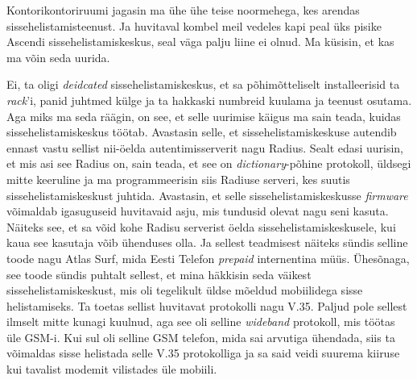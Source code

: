 Kontorikontoriruumi jagasin ma ühe ühe teise noormehega, kes arendas sissehelistamisteenust. Ja  huvitaval kombel meil vedeles kapi peal üks pisike Ascendi sissehelistamiskeskus, seal väga palju liine ei olnud. Ma küsisin, et kas ma võin seda uurida.


Ei, ta oligi \emph{deidcated} sissehelistamiskeskus, et sa põhimõtteliselt installeerisid ta \emph{rack}'i, panid  juhtmed külge ja ta hakkaski numbreid kuulama ja teenust osutama. Aga miks ma seda räägin, on see, et selle uurimise käigus ma sain teada, kuidas sissehelistamiskeskus töötab. Avastasin selle, et  sissehelistamiskeskuse autendib ennast  vastu sellist nii-öelda autentimisserverit nagu Radius. Sealt edasi uurisin, et mis asi see Radius on, sain teada, et see on \emph{dictionary}-põhine protokoll, üldsegi mitte keeruline ja ma programmeerisin siis Radiuse serveri, kes  suutis sissehelistamiskeskust juhtida. Avastasin, et selle sissehelistamiskeskusse \emph{firmware} võimaldab igasuguseid huvitavaid asju, mis tundusid olevat nagu seni kasuta. Näiteks see, et sa võid kohe Radisu serverist öelda sissehelistamiskeskusele, kui kaua see kasutaja võib ühenduses olla. Ja sellest teadmisest näiteks sündis selline toode nagu Atlas Surf, mida Eesti Telefon \emph{prepaid} internentina müüs. Ühesõnaga, see toode sündis puhtalt sellest, et mina häkkisin  seda väikest sissehelistamiskeskust, mis oli tegelikult üldse mõeldud  mobiilidega sisse helistamiseks. Ta toetas sellist huvitavat protokolli nagu V.35. Paljud pole sellest ilmselt mitte kunagi kuulnud, aga see oli selline \emph{wideband} protokoll, mis töötas üle GSM-i. Kui sul oli selline GSM telefon, mida sai arvutiga ühendada, siis ta võimaldas sisse helistada selle V.35 protokolliga ja sa said veidi suurema kiiruse kui tavalist modemit vilistades üle  mobiili. 


